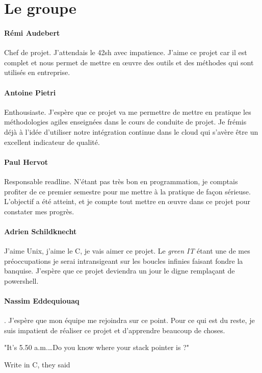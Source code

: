 \section{Le groupe}

\paragraph{Rémi Audebert} Chef de projet. J'attendais le 42sh avec impatience.
J'aime ce projet car il est complet et nous permet de mettre en œuvre des
outils et des méthodes qui sont utilisés en entreprise.

\paragraph{Antoine Pietri} Enthousiaste. J'espère que ce projet va me permettre
de mettre en pratique les méthodologies agiles enseignées dans le cours de
conduite de projet. Je frémis déjà à l'idée d'utiliser notre intégration
continue dans le cloud qui s'avère être un excellent indicateur de qualité.

\paragraph{Paul Hervot} Responsable readline. N'étant pas très bon en
programmation, je comptais profiter de ce premier semestre pour me mettre à la
pratique de façon sérieuse. L'objectif a été atteint, et je compte tout mettre
en œuvre dans ce projet pour constater mes progrès.

\paragraph{Adrien Schildknecht} J'aime Unix, j'aime le C, je vais aimer ce
projet. Le \textit{green IT} étant une de mes préoccupations je serai
intransigeant sur les boucles infinies faisant fondre la banquise.
J'espère que ce projet deviendra un jour le digne remplaçant de powershell.

\paragraph{Nassim Eddequiouaq}
\novocalize
{}. J’espère que mon
équipe me rejoindra sur ce point. Pour ce qui est du reste, je suis impatient
de réaliser ce projet et d’apprendre beaucoup de choses.

\null
\vfill
\epigraph{
         "It's 5.50 a.m.\ldots Do you know where your stack pointer is ?"
}{Write in C, they said}
